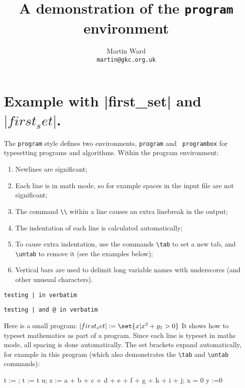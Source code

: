\documentclass{article}
\begin{document}
\title{A demonstration of the {\tt program} environment}
\author{Martin Ward\\
\tt{martin@gkc.org.uk}}
\maketitle

\tableofcontents

\section{Example with |first_set| and $|first_set|$.}


The {\tt program} style defines two environments, {\tt program} and {\tt
programbox} for typesetting programs and algorithms. Within the program
environment:
\begin{enumerate}
	\item Newlines are significant;
	\item Each line is in math mode, so for example spaces in the input
file are not significant;
	\item The command \verb:\\: within a line causes an extra
linebreak in the output;
	\item The indentation of each line is calculated automatically;
	\item To cause extra indentation, use the commands \verb:\tab: to
set a new tab, and \verb:\untab: to remove it (see the examples below);
	\item Vertical bars are used to delimit long variable names with
underscores (and other unusual characters).
\end{enumerate}

\verb:testing | in verbatim:

\begin{verbatim}
testing | and @ in verbatim
\end{verbatim}


Here is a small program: 
\( |first_set|:= \set{x | x^2 + y_1 > 0 } \)
It shows how to typeset mathematics as part of a program. Since each line is
typeset in maths mode, all spacing is done automatically. The set brackets
expand automatically, for example in this program (which also demonstrates the
\verb:\tab: and \verb:\untab: commands):
\begin{program}
t := ;
t := t \setminus u;
z := a \tab {} + b + c + d
	    {} + e + f + g
	    {} + h + i + j; \untab
\IF x = 0 \THEN y :=0 \FI
\end{program}
\end{document}
